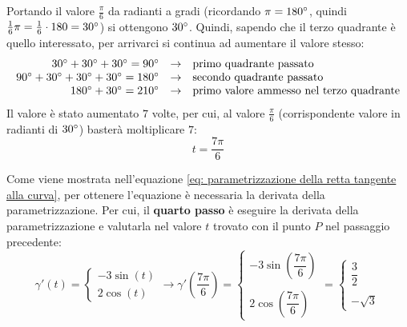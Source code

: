 \documentclass[a4paper]{article}
\begin{document}
	\noindent
	Portando il valore $\frac{\pi}{6}$ da radianti a gradi (ricordando $\pi = 180\degree$, quindi $\frac{1}{6}\pi = \frac{1}{6} \cdot 180 = 30\degree$) si ottengono $30\degree$. Quindi, sapendo che il terzo quadrante è quello interessato, per arrivarci si continua ad aumentare il valore stesso:
	\begin{gather*}
		\begin{array}{rcl}
			30\degree+30\degree+30\degree=90\degree &\rightarrow& \text{primo quadrante passato} \\
			90\degree+30\degree+30\degree+30\degree=180\degree &\rightarrow& \text{secondo quadrante passato} \\
			180\degree+30\degree = 210\degree &\rightarrow& \text{primo valore ammesso nel terzo quadrante}
		\end{array}
	\end{gather*}
	Il valore è stato aumentato $7$ volte, per cui, al valore $\frac{\pi}{6}$ (corrispondente valore in radianti di $30\degree$) basterà moltiplicare $7$:
	\begin{equation*}
		t = \dfrac{7\pi}{6}
	\end{equation*}

	\noindent
	Come viene mostrata nell'equazione \ref{eq: parametrizzazione della retta tangente alla curva}, per ottenere l'equazione è necessaria la derivata della parametrizzazione. Per cui, il \textbf{quarto passo} è eseguire la derivata della parametrizzazione e valutarla nel valore $t$ trovato con il punto $P$ nel passaggio precedente:
	\begin{equation*}
		\gamma'\left(t\right) = \begin{cases}
			-3\sin\left(t\right) \\
			2\cos\left(t\right)
		\end{cases}
		\rightarrow
		\gamma'\left(\dfrac{7\pi}{6}\right) = \begin{cases}
			-3\sin\left(\dfrac{7\pi}{6}\right) \\ \\
			2\cos\left(\dfrac{7\pi}{6}\right)
		\end{cases} = \begin{cases}
			\dfrac{3}{2} \\ \\
			-\sqrt{3}
		\end{cases}
	\end{equation*}\newpage
\end{document}
